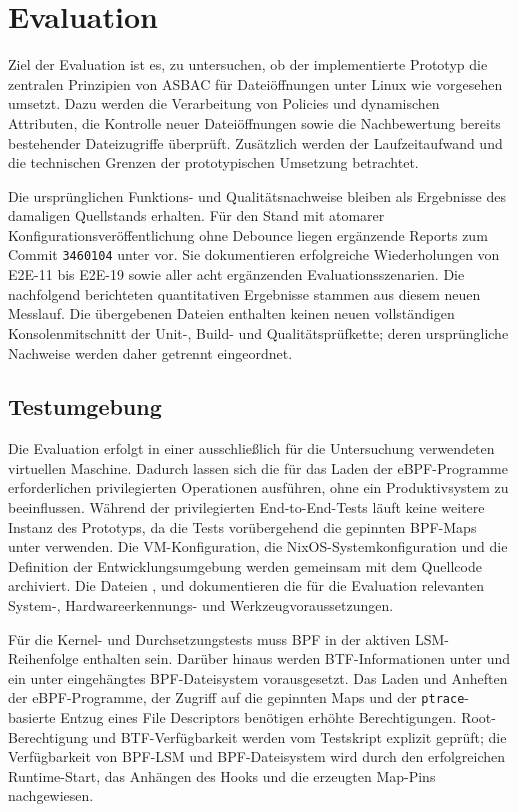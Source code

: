\section{Evaluation}\label{sec:evaluation}
Ziel der Evaluation ist es, zu untersuchen, ob der implementierte Prototyp die zentralen Prinzipien von ASBAC für Dateiöffnungen unter Linux wie vorgesehen umsetzt. Dazu werden die Verarbeitung von Policies und dynamischen Attributen, die Kontrolle neuer Dateiöffnungen sowie die Nachbewertung bereits bestehender Dateizugriffe überprüft. Zusätzlich werden der Laufzeitaufwand und die technischen Grenzen der prototypischen Umsetzung betrachtet.

Die ursprünglichen Funktions- und Qualitätsnachweise bleiben als Ergebnisse des damaligen
Quellstands erhalten. Für den Stand mit atomarer Konfigurationsveröffentlichung ohne Debounce
liegen ergänzende Reports zum Commit \texttt{3460104} unter  vor.
Sie dokumentieren erfolgreiche Wiederholungen von E2E-11 bis E2E-19 sowie aller acht ergänzenden
Evaluationsszenarien. Die nachfolgend berichteten quantitativen Ergebnisse stammen aus diesem
neuen Messlauf. Die übergebenen Dateien enthalten keinen neuen vollständigen Konsolenmitschnitt
der Unit-, Build- und Qualitätsprüfkette; deren ursprüngliche Nachweise werden daher getrennt eingeordnet.



\subsection{Testumgebung}

Die Evaluation erfolgt in einer ausschließlich für die Untersuchung verwendeten virtuellen
Maschine. Dadurch lassen sich die für das Laden der eBPF-Programme erforderlichen privilegierten
Operationen ausführen, ohne ein Produktivsystem zu beeinflussen. Während der privilegierten
End-to-End-Tests läuft keine weitere Instanz des Prototyps, da die Tests vorübergehend die
gepinnten BPF-Maps unter \mbox{} verwenden. Die VM-Konfiguration, die
NixOS-Systemkonfiguration und die Definition der Entwicklungsumgebung werden gemeinsam mit dem
Quellcode archiviert. Die Dateien ,
 und  dokumentieren die
für die Evaluation relevanten System-, Hardwareerkennungs- und Werkzeugvoraussetzungen.

Für die Kernel- und Durchsetzungstests muss BPF in der aktiven LSM-Reihenfolge enthalten sein.
Darüber hinaus werden BTF-Informationen unter \mbox{} und ein unter
\mbox{}  eingehängtes BPF-Dateisystem vorausgesetzt. Das Laden und Anheften der
eBPF-Programme, der Zugriff auf die gepinnten Maps und der \texttt{ptrace}-basierte Entzug eines
File Descriptors benötigen erhöhte Berechtigungen. Root-Berechtigung und BTF-Verfügbarkeit werden
vom Testskript explizit geprüft; die Verfügbarkeit von BPF-LSM und BPF-Dateisystem wird durch den
erfolgreichen Runtime-Start, das Anhängen des Hooks und die erzeugten Map-Pins nachgewiesen.

